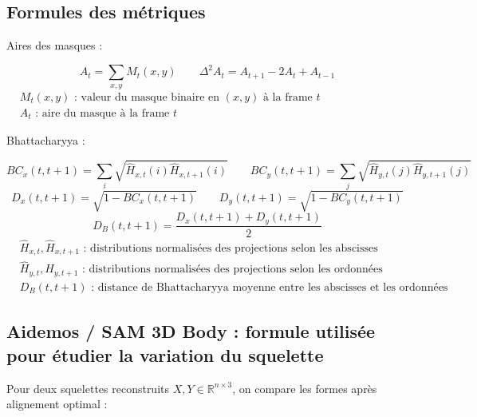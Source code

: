 \documentclass[11pt,a4paper]{article}
\begin{document}
\newpage
\subsection{Formules des métriques}

Aires des masques :
\begin{center}
\[
    A_t = \sum_{x,y} M_t(x,y)
    \qquad
    \Delta^2 A_t = A_{t+1} - 2A_t + A_{t-1}
\]
{\footnotesize
    \(
        \begin{aligned}
            &M_t(x,y) \text{ : valeur du masque binaire en } (x,y) \text{ à la frame } t \\
            &A_t \text{ : aire du masque à la frame } t
        \end{aligned}
    \)
}
\end{center}

Bhattacharyya :
\begin{center}
\[
    BC_x(t,t+1) = \sum_i \sqrt{\widehat{H}_{x,t}(i)\widehat{H}_{x,t+1}(i)}
    \qquad
    BC_y(t,t+1) = \sum_j \sqrt{\widehat{H}_{y,t}(j)\widehat{H}_{y,t+1}(j)}
\]
\vspace{0.5em}
\[
    D_x(t,t+1)=\sqrt{1-BC_x(t,t+1)}
    \qquad
    D_y(t,t+1)=\sqrt{1-BC_y(t,t+1)}
\]
\vspace{0.5em}
\[
    D_B(t,t+1)=\frac{D_x(t,t+1)+D_y(t,t+1)}{2}
\]
{\footnotesize
    \(
        \begin{aligned}
            &\widehat{H}_{x,t},\widehat{H}_{x,t+1} \text{ : distributions normalisées des projections selon les abscisses} \\
            &\widehat{H}_{y,t},\widehat{H}_{y,t+1} \text{ : distributions normalisées des projections selon les ordonnées} \\
            &D_B(t,t+1) \text{ : distance de Bhattacharyya moyenne entre les abscisses et les ordonnées}
        \end{aligned}
    \)
}
\end{center}

\newpage
\subsection{Aidemos / SAM 3D Body : formule utilisée pour étudier la variation du squelette}

Pour deux squelettes reconstruits \(X,Y \in \mathbb{R}^{n \times 3}\), on compare les formes après alignement optimal :
\end{document}
